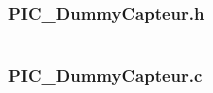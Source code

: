 \subsubsection{PIC\_DummyCapteur.h}
\inputminted[tabsize=4,linenos=true,fontsize=\footnotesize,frame=single,resetmargins=true]{c}{\SRCPATH/PIC_DummyCapteur.h}

\subsubsection{PIC\_DummyCapteur.c}
\inputminted[tabsize=4,linenos=true,fontsize=\footnotesize,frame=single,resetmargins=true]{c}{\SRCPATH/PIC_DummyCapteur.c}

